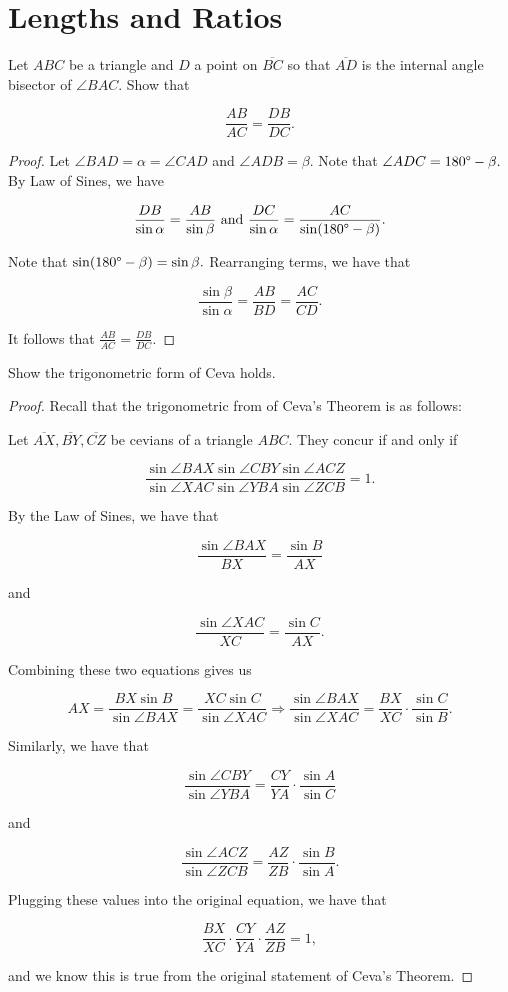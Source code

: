 \documentclass[letterpaper,oneside]{scrartcl}
\begin{document}
\section{Lengths and Ratios}
\begin{theorem*}
     Let $ABC$ be a triangle and $D$ a point on $\overline{BC}$ so that $\overline{AD}$ is the internal angle bisector of $\angle BAC.$ Show that
  
  $$\frac{AB}{AC} = \frac{DB}{DC}.$$
\end{theorem*}

\begin{proof}  Let $\angle BAD = \alpha = \angle CAD$ and $\angle ADB = \beta.$ Note that $\angle ADC = 180\degree - \beta.$ By Law of Sines, we have

$$\frac{DB}{\sin\alpha} = \frac{AB}{\sin\beta} \text{  and  } \frac{DC}{\sin\alpha} = \frac{AC}{\sin(180\degree - \beta)}.$$

Note that $\sin(180\degree-\beta) = \sin\beta.$ Rearranging terms, we have that

$$\frac{\sin\beta}{\sin\alpha} = \frac{AB}{BD} = \frac{AC}{CD}.$$

It follows that $\frac{AB}{AC} = \frac{DB}{DC}.$
\end{proof}

\begin{problem*}
  [3.5]
  Show the trigonometric form of Ceva holds.
\end{problem*}

\begin{proof}  Recall that the trigonometric from of Ceva's Theorem is as follows:

Let $\overline{AX}, \overline{BY}, \overline{CZ}$ be cevians of a triangle $ABC.$ They concur if and only if 

$$\frac{\sin \angle BAX \sin \angle CBY \sin \angle ACZ}{\sin \angle XAC \sin \angle YBA \sin \angle ZCB} = 1.$$

By the Law of Sines, we have that

$$\frac{\sin\angle BAX}{BX} = \frac{\sin B}{AX}$$

and

$$\frac{\sin\angle XAC}{XC} = \frac{\sin C}{AX}.$$

Combining these two equations gives us

$$AX = \frac{BX \sin B}{\sin\angle BAX}=\frac{XC \sin C}{\sin\angle XAC} \Rightarrow \frac{\sin \angle BAX}{\sin \angle XAC} = \frac{BX}{XC} \cdot \frac{\sin C}{\sin B}.$$

Similarly, we have that 

$$\frac{\sin \angle CBY}{\sin \angle YBA} = \frac{CY}{YA}\cdot \frac{\sin A}{\sin C} $$

and

$$
\frac{\sin \angle ACZ}{\sin \angle ZCB} = \frac{AZ}{ZB}\cdot \frac{\sin B}{\sin A}. $$

Plugging these values into the original equation, we have that

$$\frac{BX}{XC}\cdot \frac{CY}{YA} \cdot \frac{AZ}{ZB} = 1,$$

and we know this is true from the original statement of Ceva's Theorem.
\end{proof}
\end{document}

